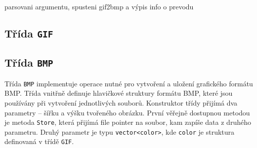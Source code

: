 \documentclass[11pt,a4paper]{article}
\begin{document}
parsovani argumentu, spusteni gif2bmp a výpis info o prevodu

\subsection{Třída \texttt{GIF}}

\subsection{Třída \texttt{BMP}}

Třída \texttt{BMP} implementuje operace nutné pro vytvoření a uložení grafického formátu BMP. Třída vnitřně definuje hlavičkové struktury formátu BMP, které jsou používány při vytvoření jednotlivých souborů. Konstruktor třídy přijímá dva parametry -- šířku a výšku tvořeného obrázku. První věřejně dostupnou metodou je metoda \texttt{Store}, která přijímá file pointer na soubor, kam zapíše data z druhého parametru. Druhý parametr je typu \texttt{vector<color>}, kde \texttt{color} je struktura definovaná v třídě \texttt{GIF}.
\end{document}
